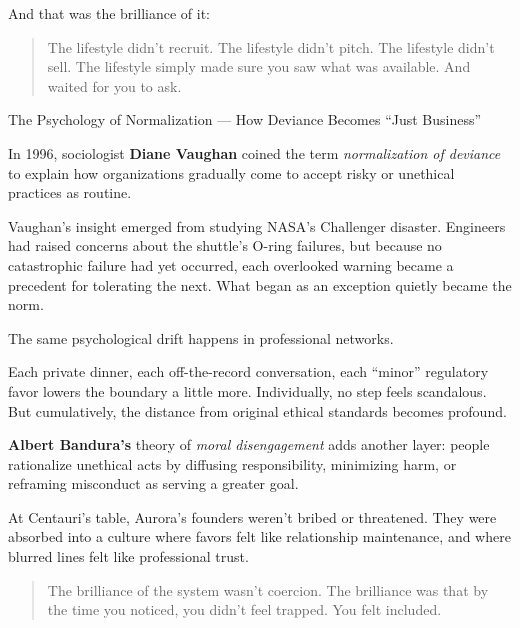 And that was the brilliance of it:

\begin{quote}
The lifestyle didn’t recruit.  
The lifestyle didn’t pitch.  
The lifestyle didn’t sell.  
The lifestyle simply made sure you saw what was available.  
And waited for you to ask.
\end{quote}

\begin{PsychologicalSidebar}{The Psychology of Normalization --- How Deviance Becomes ``Just Business''}

  In 1996, sociologist \textbf{Diane Vaughan} coined the term \emph{normalization of deviance} to explain how 
  organizations gradually come to accept risky or unethical practices as routine.

  \medskip
  
  Vaughan’s insight emerged from studying NASA’s Challenger disaster. Engineers had raised concerns about the 
  shuttle’s O-ring failures, but because no catastrophic failure had yet occurred, each overlooked warning became 
  a precedent for tolerating the next. What began as an exception quietly became the norm.

  \medskip
  
  The same psychological drift happens in professional networks.

  \medskip
  
  Each private dinner, each off-the-record conversation, each “minor” regulatory favor lowers the boundary a little more. 
  Individually, no step feels scandalous. But cumulatively, the distance from original ethical standards becomes profound.

  \medskip
  
  \textbf{Albert Bandura’s} theory of \emph{moral disengagement} adds another layer: people rationalize unethical acts by 
  diffusing responsibility, minimizing harm, or reframing misconduct as serving a greater goal.

  \medskip
  
  At Centauri’s table, Aurora’s founders weren’t bribed or threatened. They were absorbed into 
  a culture where favors felt like relationship maintenance, and where blurred lines felt like professional trust.
  
  \begin{quote}
  The brilliance of the system wasn’t coercion.  The brilliance was that by the time you noticed, you didn’t feel trapped.  
  You felt included.
  \end{quote}
  
\end{PsychologicalSidebar}


